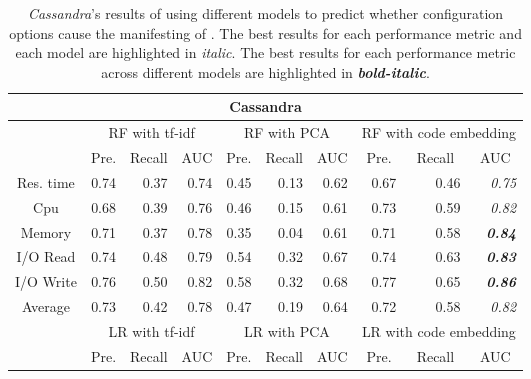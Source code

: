 \begin{table}
\tabcolsep=0.18cm
\caption{\emph{Cassandra}'s results of using different models to predict whether configuration options cause the manifesting of \inconsistent. The best results for each performance metric and each model are highlighted in \textit{italic}. The best results for each performance metric across different models are highlighted in \textbf{\textit{bold-italic}}.}
\begin{tabular}{|c|r|r|r|r|r|r|r|r|r|}
\hline
\multicolumn{10}{|c|}{Cassandra}          \\ \hline
\multirow{2}{*}{} & \multicolumn{3}{c|}{RF with tf-idf}      & \multicolumn{3}{c|}{RF with PCA}         & \multicolumn{3}{c|}{RF with code embedding}                   \\ \cline{2-10} 
                  & \multicolumn{1}{c|}{Pre.} & \multicolumn{1}{c|}{Recall} & \multicolumn{1}{c|}{AUC} & \multicolumn{1}{c|}{Pre.} & \multicolumn{1}{c|}{Recall} & \multicolumn{1}{c|}{AUC} & \multicolumn{1}{c|}{Pre.} & \multicolumn{1}{c|}{Recall} & \multicolumn{1}{c|}{AUC} \\ \hline
Res. time         & 0.74 & 0.37   & 0.74& 0.45 & 0.13   & 0.62& 0.67 & 0.46   & \textit{0.75}            \\ \hline
Cpu               & 0.68 & 0.39   & 0.76& 0.46 & 0.15   & 0.61& 0.73 & 0.59   & \textit{0.82}            \\ \hline
Memory            & 0.71 & 0.37   & 0.78& 0.35 & 0.04   & 0.61& 0.71 & 0.58   & \textit{\textbf{0.84}}   \\ \hline
I/O Read          & 0.74 & 0.48   & 0.79& 0.54 & 0.32   & 0.67& 0.74 & 0.63   & \textit{\textbf{0.83}}   \\ \hline
I/O Write         & 0.76 & 0.50   & 0.82& 0.58 & 0.32   & 0.68& 0.77 & 0.65   & \textit{\textbf{0.86}}   \\ \hline
Average           & 0.73 & 0.42   & 0.78& 0.47 & 0.19   & 0.64& 0.72 & 0.58   & \textit{0.82}            \\ \hline
\multirow{2}{*}{} & \multicolumn{3}{c|}{LR with tf-idf}      & \multicolumn{3}{c|}{LR with PCA}         & \multicolumn{3}{c|}{LR with code embedding}                   \\ \cline{2-10} 
                  & \multicolumn{1}{c|}{Pre.} & \multicolumn{1}{c|}{Recall} & \multicolumn{1}{c|}{AUC} & \multicolumn{1}{c|}{Pre.} & \multicolumn{1}{c|}{Recall} & \multicolumn{1}{c|}{AUC} & \multicolumn{1}{c|}{Pre.} & \multicolumn{1}{c|}{Recall} & \multicolumn{1}{c|}{AUC} \\ \hline

\end{tabular}
\end{table}
